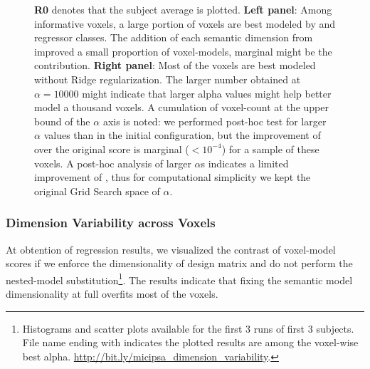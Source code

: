 \begin{figure}
    \centering
    \caption[Best Hyper-parameter Configuration Voxel-Count Histograms]{\textbf{R0} denotes that the subject average is plotted. \textbf{Left panel}: Among informative voxels, a large portion of voxels are best modeled by  and  regressor classes. The addition of each semantic dimension from  improved a small proportion of voxel-models, marginal might be the contribution. \textbf{Right panel}: Most of the voxels are best modeled without Ridge regularization. The larger number obtained at \(\alpha=10000\) might indicate that larger alpha values might help better model a thousand voxels. A cumulation of voxel-count at the upper bound of the \(\alpha\) axis is noted: we performed post-hoc test for larger \(\alpha\) values than in the initial configuration, but the improvement of  over the original score is marginal (\(<10^{-4}\)) for a sample of these voxels. A post-hoc analysis of larger \(\alpha\)s indicates a limited improvement of , thus for computational simplicity we kept the original Grid Search space of \(\alpha\).\label{fig:MIX_CountPlotAlphaDimS1R0}} 
    
\end{figure}

\subsubsection{Dimension Variability across Voxels}

At obtention of regression results, we visualized the contrast of voxel-model scores if we enforce the dimensionality of design matrix and do not perform the nested-model substitution\footnote{Histograms and scatter plots available for the first 3 runs of first 3 subjects. File name ending with  indicates the plotted results are among the voxel-wise best alpha. \url{http://bit.ly/micipsa_dimension_variability}.}. The results indicate that fixing the semantic model dimensionality at full overfits most of the voxels.

